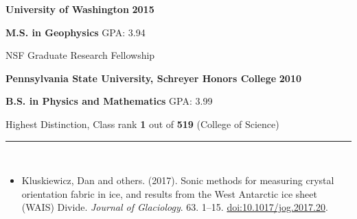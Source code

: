 \documentclass[10pt]{article}
\begin{document}

\noindent
\textbf{University of Washington} \hfill \textbf{2015}

\noindent
\textbf{M.S. in Geophysics} \hfill GPA: 3.94

\noindent
\hfill NSF Graduate Research Fellowship

\vspace{1mm}
\noindent
\textbf{Pennsylvania State University, Schreyer Honors College} \hfill \textbf{2010}

\noindent
\textbf{B.S. in Physics and Mathematics} \hfill GPA: 3.99

\noindent
\hfill Highest Distinction, Class rank \textbf{1} out of \textbf{519} (College of Science)

\vspace{1.5mm}
\noindent
\rule{\textwidth}{0.4pt}\\
\vspace{1.5mm}

\begin{itemize}
\item Kluskiewicz, Dan and others. (2017). Sonic methods for measuring crystal orientation fabric in ice, and results from the West Antarctic ice sheet (WAIS) Divide. \textit{Journal of Glaciology}. 63. 1--15. \href{https://doi.org/10.1017/jog.2017.20}{doi:10.1017/jog.2017.20}.
\end{itemize}
\end{document}
